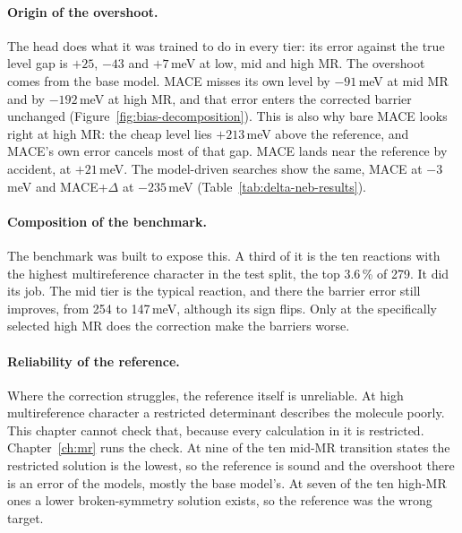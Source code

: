 \paragraph{Origin of the overshoot.} The head does what it was
trained to do in every tier: its error against the true level gap is
$+25$, $-43$ and $+7$\,meV at low, mid and high MR. The overshoot
comes from the base model. MACE misses its own level by $-91$\,meV
at mid MR and by $-192$\,meV at high MR, and that error enters the
corrected barrier unchanged (Figure~\ref{fig:bias-decomposition}).
This is also why bare MACE looks right at high MR: the cheap level
lies $+213$\,meV above the reference, and MACE's own error cancels
most of that gap. MACE lands near the reference by accident, at
$+21$\,meV. The model-driven searches show the same, MACE at
$-3$\,meV and MACE+$\Delta$ at $-235$\,meV
(Table~\ref{tab:delta-neb-results}).

\paragraph{Composition of the benchmark.} The benchmark was built to
expose this. A third of it is the ten reactions with the highest
multireference character in the test split, the top 3.6\,\% of 279.
It did its job. The mid tier is the typical reaction, and there the
barrier error still improves, from 254 to 147\,meV, although its sign
flips. Only at the specifically selected high MR does the correction
make the barriers worse.

\paragraph{Reliability of the reference.} Where the correction
struggles, the reference itself is unreliable. At high
multireference character a restricted determinant describes the
molecule poorly. This chapter cannot check that, because every
calculation in it is restricted. Chapter~\ref{ch:mr} runs the check.
At nine of the ten mid-MR transition states the restricted solution
is the lowest, so the reference is sound and the overshoot there is
an error of the models, mostly the base model's. At seven of the ten
high-MR ones a lower
broken-symmetry solution exists, so the reference was the wrong
target.

